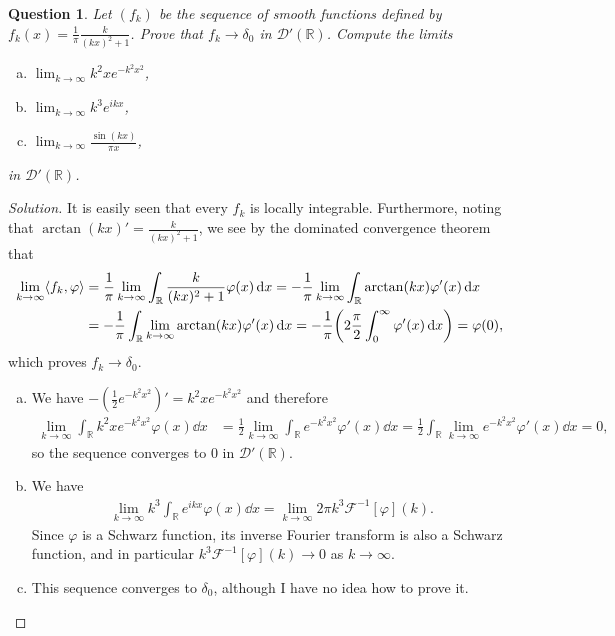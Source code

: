 \documentclass{article}
\theoremstyle{plain}
\newtheorem{question}{Question}
\theoremstyle{remark}
\newenvironment{solution}{\begin{proof}[Solution]\renewcommand\qedsymbol{}}{\end{proof}}
\renewcommand{\phi}{\varphi}
\newcommand{\Bb}{\mathbb}
\newcommand{\Cal}{\mathcal}
\newcommand{\RR}{\Bb R}
\newcommand{\DD}{\Cal D}
\DeclarePairedDelimiter{\ang}{\langle}{\rangle}
\begin{document}
\begin{question}
	Let $(f_k)$ be the sequence of smooth functions defined by $f_k(x) = \frac1\pi \frac k{(kx)^2 + 1}$. Prove that $f_k \to \delta_0$ in $\DD'(\RR)$. Compute the limits
	\begin{enumerate}[(a)]
		\item $\lim_{k\to\infty} k^2 x e^{-k^2 x^2}$,
		\item $\lim_{k\to\infty} k^3 e^{ikx}$,
		\item $\lim_{k\to\infty} \frac{\sin(kx)}{\pi x}$,
	\end{enumerate}
in $\DD'(\RR)$. 
\end{question}

\begin{solution}
	It is easily seen that every $f_k$ is locally integrable. Furthermore, noting that $\arctan(kx)' = \frac{k}{(kx)^2 + 1}$, we see by the dominated convergence theorem that
	\begin{align*}
		\lim_{k\to\infty}\ang{f_k, \phi} &= \frac1\pi \lim_{k\to\infty} \int_\RR \frac{k}{(kx)^2 + 1} \phi(x) \dd{x} = -\frac1\pi \lim_{k\to\infty} \int_\RR \arctan(kx) \phi'(x) \dd{x} \\
		&= -\frac1\pi \int_\RR \lim_{k\to\infty} \arctan(kx) \phi'(x) \dd{x} = -\frac1\pi \qty(2 \frac\pi2 \int_0^\infty \phi'(x) \dd{x} ) = \phi(0), 
	\end{align*}
which proves $f_k \to \delta_0$. 

\begin{enumerate}[(a)]
	\item We have $- (\frac12 e^{-k^2x^2})' = k^2 x e^{-k^2 x^2}$ and therefore
	\begin{align*}
		\lim_{k\to\infty} \int_\RR k^2 x e^{-k^2x^2} \phi(x) \dd{x} &= \frac12 \lim_{k\to\infty}  \int_\RR  e^{-k^2 x^2} \phi'(x) \dd{x} = \frac12 \int_\RR \lim_{k\to\infty} e^{-k^2 x^2} \phi'(x) \dd{x} = 0,
	\end{align*}
so the sequence converges to 0 in $\DD'(\RR)$. 

\item We have 
\begin{align*}
	\lim_{k\to\infty}  k^3 \int_\RR e^{ikx} \phi(x) \dd{x} = \lim_{k\to\infty} 2\pi k^3 \Cal F^{-1}[\phi](k). 
\end{align*}
Since $\phi$ is a Schwarz function, its inverse Fourier transform is also a Schwarz function, and in particular $k^3 \Cal F^{-1}[\phi](k) \to 0$ as $k \to \infty$. 

\item This sequence converges to $\delta_0$, although I have no idea how to prove it. 

\end{enumerate}
\end{solution}
\end{document}
